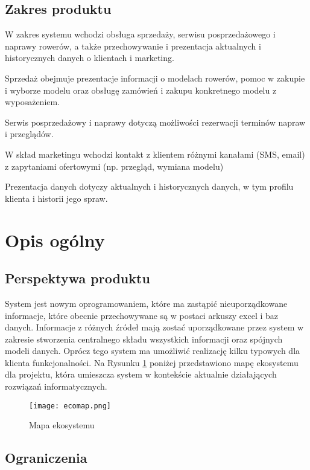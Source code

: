 \documentclass[a4paper,20pt]{article}
\begin{document}
\newpage
\subsection{Zakres produktu}
W zakres systemu wchodzi obsługa sprzedaży, serwisu posprzedażowego i naprawy rowerów, a także przechowywanie i prezentacja aktualnych i historycznych danych o klientach i marketing. 

Sprzedaż obejmuje prezentacje informacji o modelach rowerów, pomoc w zakupie i wyborze modelu oraz obsługę zamówień i zakupu konkretnego modelu z wyposażeniem.

Serwis posprzedażowy i naprawy dotyczą możliwości rezerwacji terminów napraw i przeglądów.

W skład marketingu wchodzi kontakt z klientem różnymi kanałami (SMS, email) z zapytaniami ofertowymi (np. przegląd, wymiana modelu)  

Prezentacja danych dotyczy aktualnych i historycznych danych, w tym profilu klienta i historii jego spraw. 

\newpage





\section{Opis ogólny}


\subsection{Perspektywa produktu}

System jest nowym oprogramowaniem, które ma zastąpić nieuporządkowane informacje, które obecnie przechowywane są w postaci arkuszy excel i baz danych. Informacje z różnych źródeł mają zostać uporządkowane przez system w zakresie stworzenia centralnego składu wszystkich informacji oraz spójnych modeli danych. Oprócz tego system ma umożliwić realizację kilku typowych dla klienta funkcjonalności. Na Rysunku \ref{ekosys} poniżej przedstawiono mapę ekosystemu dla projektu, która umieszcza system w kontekście aktualnie działających rozwiązań informatycznych. 


\begin{figure}[H]
\centerline{\texttt{[image: ecomap.png]}}
\caption{Mapa ekosystemu}
\label{ekosys}
\end{figure}



\newpage
\subsection{Ograniczenia}
\end{document}
